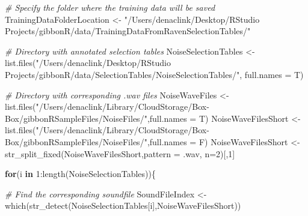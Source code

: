 \documentclass[
]{book}
\newenvironment{Shaded}{\begin{snugshade}}{\end{snugshade}}
\newcommand{\AttributeTok}[1]{\textcolor[rgb]{0.77,0.63,0.00}{#1}}
\newcommand{\CommentTok}[1]{\textcolor[rgb]{0.56,0.35,0.01}{\textit{#1}}}
\newcommand{\ControlFlowTok}[1]{\textcolor[rgb]{0.13,0.29,0.53}{\textbf{#1}}}
\newcommand{\DecValTok}[1]{\textcolor[rgb]{0.00,0.00,0.81}{#1}}
\newcommand{\FunctionTok}[1]{\textcolor[rgb]{0.00,0.00,0.00}{#1}}
\newcommand{\NormalTok}[1]{#1}
\newcommand{\OtherTok}[1]{\textcolor[rgb]{0.56,0.35,0.01}{#1}}
\newcommand{\SpecialCharTok}[1]{\textcolor[rgb]{0.00,0.00,0.00}{#1}}
\newcommand{\StringTok}[1]{\textcolor[rgb]{0.31,0.60,0.02}{#1}}
\begin{document}
\begin{Shaded}
\begin{Highlighting}[]
\CommentTok{\# Specify the folder where the training data will be saved}
\NormalTok{TrainingDataFolderLocation }\OtherTok{\textless{}{-}} \StringTok{"/Users/denaclink/Desktop/RStudio Projects/gibbonR/data/TrainingDataFromRavenSelectionTables/"}

\CommentTok{\# Directory with annotated selection tables}
\NormalTok{NoiseSelectionTables }\OtherTok{\textless{}{-}} \FunctionTok{list.files}\NormalTok{(}\StringTok{"/Users/denaclink/Desktop/RStudio Projects/gibbonR/data/SelectionTables/NoiseSelectionTables/"}\NormalTok{,}
                                       \AttributeTok{full.names =}\NormalTok{ T)}

\CommentTok{\# Directory with corresponding .wav files}
\NormalTok{NoiseWaveFiles }\OtherTok{\textless{}{-}} \FunctionTok{list.files}\NormalTok{(}\StringTok{"/Users/denaclink/Library/CloudStorage/Box{-}Box/gibbonRSampleFiles/NoiseFiles/"}\NormalTok{,}\AttributeTok{full.names =}\NormalTok{ T)}
\NormalTok{NoiseWaveFilesShort }\OtherTok{\textless{}{-}} \FunctionTok{list.files}\NormalTok{(}\StringTok{"/Users/denaclink/Library/CloudStorage/Box{-}Box/gibbonRSampleFiles/NoiseFiles/"}\NormalTok{,}\AttributeTok{full.names =}\NormalTok{ F)}
\NormalTok{NoiseWaveFilesShort }\OtherTok{\textless{}{-}} \FunctionTok{str\_split\_fixed}\NormalTok{(NoiseWaveFilesShort,}\AttributeTok{pattern =} \StringTok{\textquotesingle{}.wav\textquotesingle{}}\NormalTok{, }\AttributeTok{n=}\DecValTok{2}\NormalTok{)[,}\DecValTok{1}\NormalTok{]}

\ControlFlowTok{for}\NormalTok{(i }\ControlFlowTok{in} \DecValTok{1}\SpecialCharTok{:}\FunctionTok{length}\NormalTok{(NoiseSelectionTables))\{}
  
  \CommentTok{\# Find the corresponding soundfile}
\NormalTok{  SoundFileIndex }\OtherTok{\textless{}{-}} \FunctionTok{which}\NormalTok{(}\FunctionTok{str\_detect}\NormalTok{(NoiseSelectionTables[i],NoiseWaveFilesShort))}


\end{Highlighting}
\end{Shaded}
\end{document}
